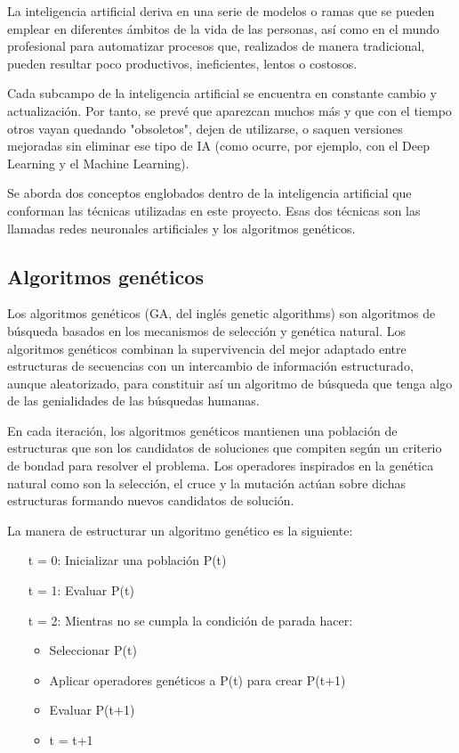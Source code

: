 La inteligencia artificial deriva en una serie de modelos o ramas que se pueden emplear en diferentes ámbitos de la vida de las personas, así como en el mundo profesional para automatizar procesos que, realizados de manera tradicional, pueden resultar poco productivos, ineficientes, lentos o costosos.

Cada subcampo de la inteligencia artificial se encuentra en constante cambio y actualización. Por tanto, se prevé que aparezcan muchos más y que con el tiempo otros vayan quedando "obsoletos", dejen de utilizarse, o saquen versiones mejoradas sin eliminar ese tipo de IA (como ocurre, por ejemplo, con el Deep Learning y el Machine Learning).

Se aborda dos conceptos englobados dentro de la inteligencia artificial que conforman las técnicas utilizadas en este proyecto. Esas dos técnicas son las llamadas redes neuronales artificiales y los algoritmos genéticos.

\subsection{Algoritmos genéticos}

Los algoritmos genéticos (GA, del inglés genetic algorithms) son algoritmos de búsqueda basados en los mecanismos de selección y genética natural. Los algoritmos genéticos combinan la supervivencia del mejor adaptado entre estructuras de secuencias con un intercambio de información estructurado, aunque aleatorizado, para constituir así un algoritmo de búsqueda que tenga algo de las genialidades de las búsquedas humanas.

En cada iteración, los algoritmos genéticos mantienen una población de estructuras que son los candidatos de soluciones que compiten según un criterio de bondad para resolver el problema. Los operadores inspirados en la genética natural como son la selección, el cruce y la mutación actúan sobre dichas estructuras formando nuevos candidatos de solución.

La manera de estructurar un algoritmo genético es la siguiente:
\begin{enumerate}
\item[t = 0:] Inicializar una población P(t)
\item[t = 1:] Evaluar P(t)
\item[t = 2:] Mientras no se cumpla la condición de parada hacer:
\begin{itemize}
\item Seleccionar P(t)
\item Aplicar operadores genéticos a P(t) para crear P(t+1) 
\item Evaluar P(t+1)
\item t = t+1
\end{itemize}
\end{enumerate}

